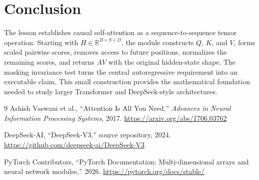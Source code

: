 \documentclass[11pt]{article}
\begin{document}
\section{Conclusion}
The lesson establishes causal self-attention as a sequence-to-sequence tensor
operation. Starting with $H\in\mathbb{R}^{B\times S\times D}$, the module
constructs $Q$, $K$, and $V$, forms scaled pairwise scores, removes access to
future positions, normalizes the remaining scores, and returns $AV$ with the
original hidden-state shape. The masking invariance test turns the central
autoregressive requirement into an executable claim. This small construction
provides the mathematical foundation needed to study larger Transformer and
DeepSeek-style architectures.

\begin{thebibliography}{9}
Ashish Vaswani et al., ``Attention Is All You Need,''
\emph{Advances in Neural Information Processing Systems}, 2017.
\url{https://arxiv.org/abs/1706.03762}

DeepSeek-AI, ``DeepSeek-V3,'' source repository, 2024.
\url{https://github.com/deepseek-ai/DeepSeek-V3}

PyTorch Contributors, ``PyTorch Documentation: Multi-dimensional arrays and
neural network modules,'' 2026.
\url{https://pytorch.org/docs/stable/}
\end{thebibliography}
\end{document}
